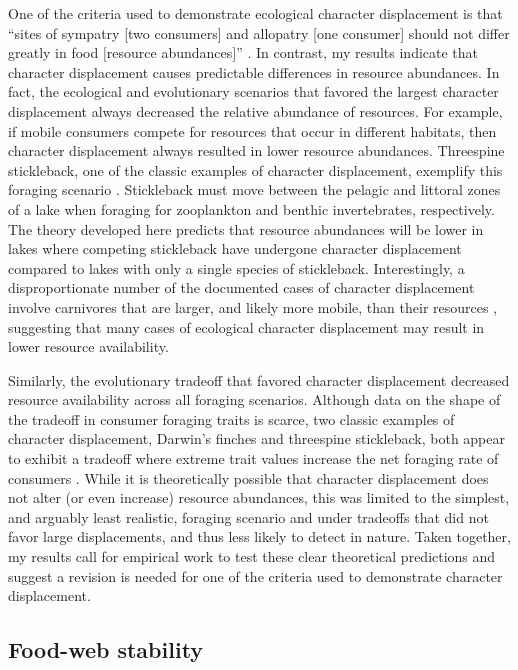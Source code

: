 \documentclass[11pt,]{article}
\begin{document}
One of the criteria used to demonstrate ecological character
displacement is that ``sites of sympatry {[}two consumers{]} and
allopatry {[}one consumer{]} should not differ greatly in food
\(\textbf{[}\)resource abundances\(\textbf{]}\)'' \citep{Schluter1992}.
In contrast, my results indicate that character displacement causes
predictable differences in resource abundances. In fact, the ecological
and evolutionary scenarios that favored the largest character
displacement always decreased the relative abundance of resources. For
example, if mobile consumers compete for resources that occur in
different habitats, then character displacement always resulted in lower
resource abundances. Threespine stickleback, one of the classic examples
of character displacement, exemplify this foraging scenario
\citep{Schluter1992, Schluter2000}. Stickleback must move between the
pelagic and littoral zones of a lake when foraging for zooplankton and
benthic invertebrates, respectively. The theory developed here predicts
that resource abundances will be lower in lakes where competing
stickleback have undergone character displacement compared to lakes with
only a single species of stickleback. Interestingly, a disproportionate
number of the documented cases of character displacement involve
carnivores \citep{Schluter2000} that are larger, and likely more mobile,
than their resources \citep{McCann2005}, suggesting that many cases of
ecological character displacement may result in lower resource
availability.

Similarly, the evolutionary tradeoff that favored character displacement
decreased resource availability across all foraging scenarios. Although
data on the shape of the tradeoff in consumer foraging traits is scarce,
two classic examples of character displacement, Darwin's finches and
threespine stickleback, both appear to exhibit a tradeoff where extreme
trait values increase the net foraging rate of consumers
\citep{Schluter1985, Arnegard2014}. While it is theoretically possible
that character displacement does not alter (or even increase) resource
abundances, this was limited to the simplest, and arguably least
realistic, foraging scenario and under tradeoffs that did not favor
large displacements, and thus less likely to detect in nature. Taken
together, my results call for empirical work to test these clear
theoretical predictions and suggest a revision is needed for one of the
criteria used to demonstrate character displacement.

\subsection{Food-web stability}\label{food-web-stability}
\end{document}
